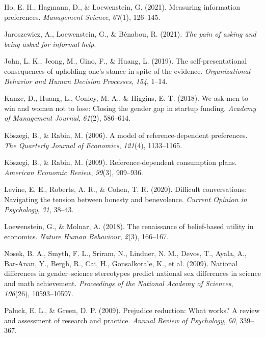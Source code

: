 \documentclass[
  man,
  floatsintext,
  longtable,
  nolmodern,
  notxfonts,
  notimes,
  colorlinks=true,linkcolor=blue,citecolor=blue,urlcolor=blue]{apa7}
\newlength{\cslhangindent}
\newenvironment{CSLReferences}[2] %
 {\begin{list}{}{%
  \setlength{\itemindent}{0pt}
  \setlength{\leftmargin}{0pt}
  \setlength{\parsep}{0pt}
  \ifodd #1
   \setlength{\leftmargin}{\cslhangindent}
   \setlength{\itemindent}{-1\cslhangindent}
  \fi
  \setlength{\itemsep}{#2\baselineskip}}}
 {\end{list}}
\begin{document}
\begin{CSLReferences}{1}{0}
Ho, E. H., Hagmann, D., \& Loewenstein, G. (2021). Measuring information
preferences. \emph{Management Science}, \emph{67}(1), 126--145.

Jaroszewicz, A., Loewenstein, G., \& Bénabou, R. (2021). \emph{The pain
of asking and being asked for informal help}.

John, L. K., Jeong, M., Gino, F., \& Huang, L. (2019). The
self-presentational consequences of upholding one's stance in spite of
the evidence. \emph{Organizational Behavior and Human Decision
Processes}, \emph{154}, 1--14.

Kanze, D., Huang, L., Conley, M. A., \& Higgins, E. T. (2018). We ask
men to win and women not to lose: {Closing} the gender gap in startup
funding. \emph{Academy of Management Journal}, \emph{61}(2), 586--614.

Kőszegi, B., \& Rabin, M. (2006). A model of reference-dependent
preferences. \emph{The Quarterly Journal of Economics}, \emph{121}(4),
1133--1165.

Kőszegi, B., \& Rabin, M. (2009). Reference-dependent consumption plans.
\emph{American Economic Review}, \emph{99}(3), 909--936.

Levine, E. E., Roberts, A. R., \& Cohen, T. R. (2020). Difficult
conversations: Navigating the tension between honesty and benevolence.
\emph{Current Opinion in Psychology}, \emph{31}, 38--43.

Loewenstein, G., \& Molnar, A. (2018). The renaissance of belief-based
utility in economics. \emph{Nature Human Behaviour}, \emph{2}(3),
166--167.

Nosek, B. A., Smyth, F. L., Sriram, N., Lindner, N. M., Devos, T.,
Ayala, A., Bar-Anan, Y., Bergh, R., Cai, H., Gonsalkorale, K., et al.
(2009). National differences in gender--science stereotypes predict
national sex differences in science and math achievement.
\emph{Proceedings of the National Academy of Sciences}, \emph{106}(26),
10593--10597.

Paluck, E. L., \& Green, D. P. (2009). Prejudice reduction: What works?
A review and assessment of research and practice. \emph{Annual Review of
Psychology}, \emph{60}, 339--367.


\end{CSLReferences}
\end{document}
